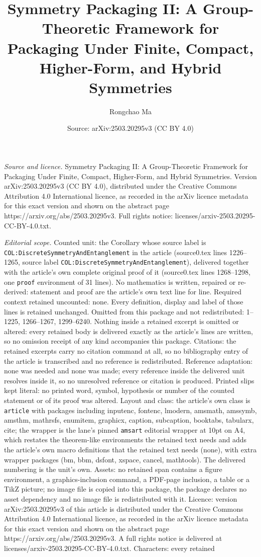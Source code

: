 \documentclass[10pt,a4paper]{amsart}
\title[Symmetry Packaging II: A Group-Theoretic Framework for Packa]{Symmetry Packaging II: A Group-Theoretic Framework for Packaging Under Finite, Compact, Higher-Form, and Hybrid Symmetries}
\author{Rongchao Ma}
\date{Source: arXiv:2503.20295v3 (CC BY 4.0)}
\begin{document}
\maketitle

\noindent\emph{Source and licence.} Symmetry Packaging II: A Group-Theoretic Framework for Packaging Under Finite, Compact, Higher-Form, and Hybrid Symmetries. Version arXiv:2503.20295v3 (CC BY 4.0), distributed under the Creative Commons Attribution 4.0 International licence, as recorded in the arXiv licence metadata for this exact version and shown on the abstract page https://arxiv.org/abs/2503.20295v3. Full rights notice: licenses/arxiv-2503.20295-CC-BY-4.0.txt.\par\smallskip

\noindent\textit{Editorial scope.} Counted unit: the Corollary whose source label is \texttt{COL:DiscreteSymmetryAndEntanglement} in the article (source0.tex lines 1226--1265, source label \texttt{COL:DiscreteSymmetryAndEntanglement}), delivered together with the article's own complete original proof of it (source0.tex lines 1268--1298, one \texttt{proof} environment of 31 lines). No mathematics is written, repaired or re-derived: statement and proof are the article's own text line for line. Required context retained uncounted: none. Every definition, display and label of those lines is retained unchanged. Omitted from this package and not redistributed: 1--1225, 1266--1267, 1299--6240. Nothing inside a retained excerpt is omitted or altered: every retained body is delivered exactly as the article's lines are written, so no omission receipt of any kind accompanies this package. Citations: the retained excerpts carry no citation command at all, so no bibliography entry of the article is transcribed and no reference is redistributed. Reference adaptation: none was needed and none was made; every reference inside the delivered unit resolves inside it, so no unresolved reference or citation is produced. Printed slips kept literal: no printed word, symbol, hypothesis or number of the counted statement or of its proof was altered. Layout and class: the article's own class is \texttt{article} with packages including inputenc, fontenc, lmodern, amsmath, amssymb, amsthm, mathrsfs, enumitem, graphicx, caption, subcaption, booktabs, tabularx, cite; the wrapper is the lane's pinned \texttt{amsart} editorial wrapper at 10pt on A4, which restates the theorem-like environments the retained text needs and adds the article's own macro definitions that the retained text needs (none), with extra wrapper packages (bm, bbm, dsfont, xspace, cancel, mathtools). The delivered numbering is the unit's own. Assets: no retained span contains a figure environment, a graphics-inclusion command, a PDF-page inclusion, a table or a TikZ picture; no image file is copied into this package, the package declares no asset dependency and no image file is redistributed with it. Licence: version arXiv:2503.20295v3 of this article is distributed under the Creative Commons Attribution 4.0 International licence, as recorded in the arXiv licence metadata for this exact version and shown on the abstract page https://arxiv.org/abs/2503.20295v3. A full rights notice is delivered at licenses/arxiv-2503.20295-CC-BY-4.0.txt. Characters: every retained 
\end{document}
